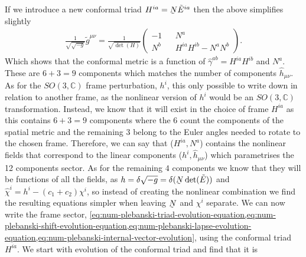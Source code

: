 \documentclass[10pt]{report}
\newcommand{\utilde}[1]{\underaccent{\tilde}{#1}}
\theoremstyle{definition}
\newcommand{\C}[0]{\mathbb{C}}
\newcommand{\tE}[0]{\tilde{E}}
\newcommand{\tg}[0]{\tilde{g}}
\newcommand{\dlap}[0]{\utilde{N}}
\begin{document}
    If we introduce a new conformal triad $H^{ia} = \dlap \tE^{ia}$ then the above simplifies slightly 
    \begin{align}
        \frac{1}{\sqrt{\sqrt{-g}}} \tg^{\mu\nu} = \frac{1}{\sqrt{\det(H)}} \begin{pmatrix}
            -1 && N^a \\ N^b && H^{ia} H^{ib} - N^a N^b
        \end{pmatrix}.
    \end{align}
    Which shows that the conformal metric is a function of $\hat{\gamma}^{ab} = H^{ia} H^{ib}$ and $N^a$. These are $6+3=9$ components which matches the number of components $\hat{h}_{\mu\nu}$. As for the $SO(3,\C)$ frame perturbation, $h^i$, this only possible to write down in relation to another frame, as the nonlinear version of $h^i$ would be an $SO(3,\C)$ transformation. Instead, we know that it will exist in the choice of frame $H^{ia}$ as this contains $6+3 = 9$ components where the $6$ count the components of the spatial metric and the remaining $3$ belong to the Euler angles needed to rotate to the chosen frame. Therefore, we can say that ($H^{ia},N^a$) contains the nonlinear fields that correspond to the linear components ($h^i, \hat{h}_{\mu\nu}$) which parametrises the 12 components sector. As for the remaining $4$ components we know that they will be functions of all the fields, as $h = \delta\sqrt{-g} = \delta(\dlap \det(\tE))$ and $\hat{\chi}^i = h^i - (c_1+c_2) \chi^i$, so instead of creating the nonlinear combination we find the resulting equations simpler when leaving $\dlap$ and $\chi^i$ separate. We can now write the frame sector, \cref{eq:num-plebanski-triad-evolution-equation,eq:num-plebanski-shift-evolution-equation,eq:num-plebanski-lapse-evolution-equation,eq:num-plebanski-internal-vector-evolution}, using the conformal triad $H^{ia}$. We start with evolution of the conformal triad and find that it is
\end{document}
